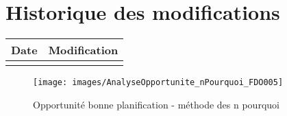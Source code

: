 \section*{Historique des modifications}
\begin{table}[h]
\centering
	\begin{tabularx}{16.8cm}{|X|X|}
	\hline
	\rowcolor{gray!40} Date & Modification \\%
	\hline
	  & \\
	\hline
	\end{tabularx}
\end{table}
\newpage


\begin{figure}
	\centering
	\texttt{[image: images/AnalyseOpportunite\_nPourquoi\_FDO005]}
	\caption{\label{opportunite bonne planification}Opportunité bonne planification - méthode des n pourquoi}
\end{figure}
